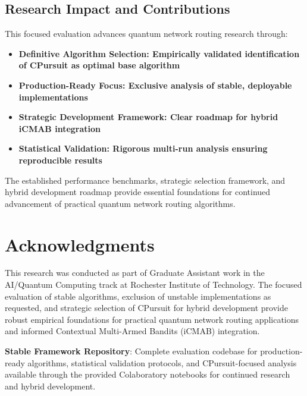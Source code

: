 \documentclass[12pt,a4paper]{article}
\newcommand{\performance}[1]{\textcolor{performancecolor}{\textbf{#1}}}
\newcommand{\stochastic}[1]{\textcolor{stochasticcolor}{\textbf{#1}}}
\newcommand{\success}[1]{\textcolor{successcolor}{\textbf{#1}}}
\newcommand{\hybrid}[1]{\textcolor{hybridcolor}{\textbf{#1}}}
\begin{document}
\subsection{Research Impact and Contributions}

This focused evaluation advances quantum network routing research through:

\begin{itemize}
\item \performance{\textbf{Definitive Algorithm Selection}: Empirically validated identification of CPursuit as optimal base algorithm}
\item \success{\textbf{Production-Ready Focus}: Exclusive analysis of stable, deployable implementations}
\item \hybrid{\textbf{Strategic Development Framework}: Clear roadmap for hybrid iCMAB integration}
\item \stochastic{\textbf{Statistical Validation}: Rigorous multi-run analysis ensuring reproducible results}
\end{itemize}

The established performance benchmarks, strategic selection framework, and hybrid development roadmap provide essential foundations for continued advancement of practical quantum network routing algorithms.

\section{Acknowledgments}

This research was conducted as part of Graduate Assistant work in the AI/Quantum Computing track at Rochester Institute of Technology. The focused evaluation of stable algorithms, exclusion of unstable implementations as requested, and strategic selection of CPursuit for hybrid development provide robust empirical foundations for practical quantum network routing applications and informed Contextual Multi-Armed Bandits (iCMAB) integration.

\textbf{Stable Framework Repository}: Complete evaluation codebase for production-ready algorithms, statistical validation protocols, and CPursuit-focused analysis available through the provided Colaboratory notebooks for continued research and hybrid development.
\end{document}
